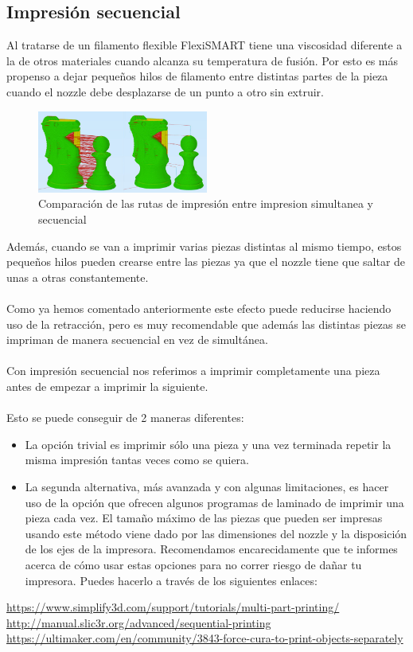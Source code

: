 \documentclass[11pt,a4paper]{article}
\begin{document}
	\subsection{Impresión secuencial}
Al tratarse de un filamento flexible FlexiSMART tiene una viscosidad diferente a la de otros materiales cuando alcanza su temperatura de fusión. Por esto es más propenso a dejar pequeños hilos de filamento entre distintas partes de la pieza cuando el nozzle debe desplazarse de un punto a otro sin extruir.
\begin{figure}[H]
\centering
\includegraphics[width=0.5\textwidth,cfbox=azul_marcos 4pt 0pt]{FOTOS/SEQUENTIALPRINTING}
\caption*{Comparación de las rutas de impresión entre impresion simultanea y secuencial}
\end{figure}
Además, cuando se van a imprimir varias piezas distintas al mismo tiempo, estos pequeños hilos pueden crearse entre las piezas ya que el nozzle tiene que saltar de unas a otras constantemente.
\\\\
Como ya hemos comentado anteriormente este efecto puede reducirse haciendo uso de la retracción, pero es muy recomendable que además las distintas piezas se impriman de manera secuencial en vez de simultánea.
\\\\
Con impresión secuencial nos referimos a imprimir completamente una pieza antes de empezar a imprimir la siguiente.
\\\\
Esto se puede conseguir de 2 maneras diferentes:
\begin{itemize}
\item La opción trivial es imprimir sólo una pieza y una vez terminada repetir la misma impresión tantas veces como se quiera.
\item La segunda alternativa, más avanzada y con algunas limitaciones, es hacer uso de la opción que ofrecen algunos programas de laminado de imprimir una pieza cada vez. El tamaño máximo de las piezas que pueden ser impresas usando este método viene dado por las dimensiones del nozzle y la disposición de los ejes de la impresora. Recomendamos encarecidamente que te informes acerca de cómo usar estas opciones para no correr riesgo de dañar tu impresora. Puedes hacerlo a través de los siguientes enlaces:
\end{itemize}
\url{https://www.simplify3d.com/support/tutorials/multi-part-printing/}\\
\url{http://manual.slic3r.org/advanced/sequential-printing}\\
\url{https://ultimaker.com/en/community/3843-force-cura-to-print-objects-separately}
\end{document}
